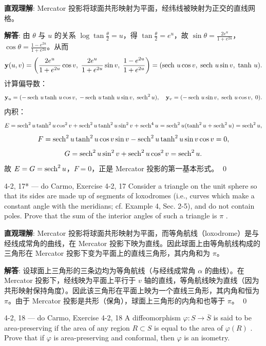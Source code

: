 \begin{solution}
\textbf{直观理解}: Mercator 投影将球面共形映射为平面，经纬线被映射为正交的直线网格。

\textbf{解答}: 由 $\theta$ 与 $u$ 的关系 $\log\tan\frac{\theta}{2}=u$，得 $\tan\frac{\theta}{2}=e^u$，故 $\sin\theta = \frac{2e^u}{1+e^{2u}}$，$\cos\theta = \frac{1-e^{2u}}{1+e^{2u}}$。从而
\[
\mathbf{y}(u,v) = \left(\frac{2e^u}{1+e^{2u}}\cos v,\;\frac{2e^u}{1+e^{2u}}\sin v,\;\frac{1-e^{2u}}{1+e^{2u}}\right) = (\operatorname{sech}\,u\cos v,\;\operatorname{sech}\,u\sin v,\;\tanh\,u).
\]
计算偏导数：
\[
\mathbf{y}_u = (-\operatorname{sech}\,u\tanh\,u\cos v,\;-\operatorname{sech}\,u\tanh\,u\sin v,\;\operatorname{sech}^2 u),\quad
\mathbf{y}_v = (-\operatorname{sech}\,u\sin v,\;\operatorname{sech}\,u\cos v,\;0).
\]
内积：
\[
E = \operatorname{sech}^2u\tanh^2u\cos^2v + \operatorname{sech}^2u\tanh^2u\sin^2v + \operatorname{sech}^4u = \operatorname{sech}^2u(\tanh^2u + \operatorname{sech}^2u) = \operatorname{sech}^2u,
\]
\[
F = \operatorname{sech}^2u\tanh^2u\cos v\sin v - \operatorname{sech}^2u\tanh^2u\sin v\cos v = 0,
\]
\[
G = \operatorname{sech}^2u\sin^2v + \operatorname{sech}^2u\cos^2v = \operatorname{sech}^2u.
\]
故 $E=G=\operatorname{sech}^2u$，$F=0$，正是 Mercator 投影的第一基本形式。
\qed
\end{solution}

\begin{exercise}{4-2, 17* — do Carmo, Exercise 4-2, 17}
Consider a triangle on the unit sphere so that its sides are made up of segments of loxodromes (i.e., curves which make a constant angle with the meridians; cf. Example 4, Sec. 2-5), and do not contain poles. Prove that the sum of the interior angles of such a triangle is $\pi$ .
\end{exercise}

\begin{solution}
\textbf{直观理解}: Mercator 投影将球面共形映射为平面，而等角航线（loxodrome）是与经线成常角的曲线，在 Mercator 投影下映为直线。因此球面上由等角航线构成的三角形在 Mercator 投影下变为平面上的直线三角形，其内角和为 $\pi$。

\textbf{解答}: 设球面上三角形的三条边均为等角航线（与经线成常角 $\alpha$ 的曲线）。在 Mercator 投影下，经线映为平面上平行于 $v$ 轴的直线，等角航线映为直线（因为共形映射保持角度）。因此该三角形在平面上映为一个直线三角形，其内角和恒为 $\pi$。由于 Mercator 投影是共形（保角），球面上三角形的内角和也等于 $\pi$。
\qed
\end{solution}

\begin{exercise}{4-2, 18 — do Carmo, Exercise 4-2, 18}
A diffeomorphism $\varphi \colon S \to \bar{S}$ is said to be area-preserving if the area of any region $R \subset S$ is equal to the area of $\varphi(R)$ . Prove that if $\varphi$ is area-preserving and conformal, then $\varphi$ is an isometry.
\end{exercise}

